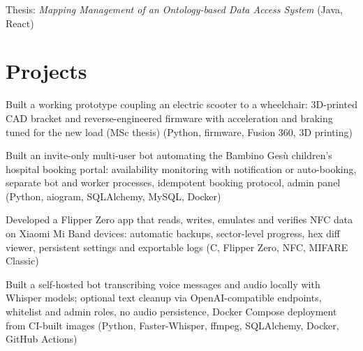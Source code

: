 \documentclass[a4paper,10pt]{article}
\begin{document}
\begin{cvitems}
  \item Thesis: \textit{Mapping Management of an Ontology-based Data Access System} (Java, React)
\end{cvitems}


\section{Projects}

\begin{cvitems}
  \item Built a working prototype coupling an electric scooter to a wheelchair: 3D-printed CAD bracket and reverse-engineered firmware with acceleration and braking tuned for the new load (MSc thesis) (Python, firmware, Fusion 360, 3D printing)
\end{cvitems}

\begin{cvitems}
  \item Built an invite-only multi-user bot automating the Bambino Ges\`u children's hospital booking portal: availability monitoring with notification or auto-booking, separate bot and worker processes, idempotent booking protocol, admin panel (Python, aiogram, SQLAlchemy, MySQL, Docker)
\end{cvitems}

\begin{cvitems}
  \item Developed a Flipper Zero app that reads, writes, emulates and verifies NFC data on Xiaomi Mi Band devices: automatic backups, sector-level progress, hex diff viewer, persistent settings and exportable logs (C, Flipper Zero, NFC, MIFARE Classic)
\end{cvitems}

\begin{cvitems}
  \item Built a self-hosted bot transcribing voice messages and audio locally with Whisper models; optional text cleanup via OpenAI-compatible endpoints, whitelist and admin roles, no audio persistence, Docker Compose deployment from CI-built images (Python, Faster-Whisper, ffmpeg, SQLAlchemy, Docker, GitHub Actions)
\end{cvitems}
\end{document}
